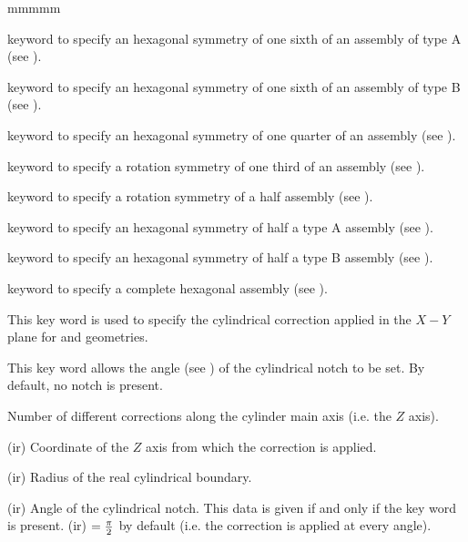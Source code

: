 \begin{ListeDeDescription}{mmmmm}
\item[\moc{SA60}] keyword to specify an hexagonal symmetry of one sixth of an
assembly of type A (see ).

\item[\moc{SB60}] keyword to specify an hexagonal symmetry of one sixth of an
assembly of type B (see ).

\item[\moc{S90}] keyword to specify an hexagonal symmetry of one quarter of an
assembly (see ).

\item[\moc{R120}] keyword to specify a rotation symmetry of one third of an
assembly (see ).

\item[\moc{R180}] keyword to specify a rotation symmetry of a half assembly
(see ).

\item[\moc{SA180}] keyword to specify an hexagonal symmetry of half a type A
assembly (see ).

\item[\moc{SB180}] keyword to specify an hexagonal symmetry of half a type B
assembly (see ).

\item[\moc{COMPLETE}] keyword to specify a complete hexagonal assembly (see
).

\item[\moc{RADS}] This key word is used to specify the cylindrical correction applied in the $X-Y$ plane for  and  geometries.\cite{roy}

\item[\moc{ANG}] This key word allows  the angle (see )
of the cylindrical notch to be set. By default, no notch is present.

\item[\dusa{nrads}] Number of different corrections along the cylinder main axis (i.e. the $Z$ axis).

\item[\dusa{xrad}(ir)] Coordinate of the $Z$ axis from which the correction is applied.

\item[\dusa{rrad}(ir)] Radius of the real cylindrical boundary.

\item[\dusa{ang}(ir)] Angle of the cylindrical notch. This data is given if and only if the key word  is present. (ir) $= {\pi \over 2}$ by default (i.e. the correction is applied at every angle).

\end{ListeDeDescription}
\goodbreak


